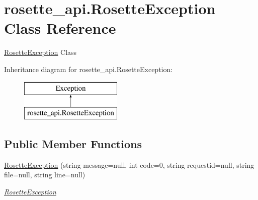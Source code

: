 \hypertarget{classrosette__api_1_1_rosette_exception}{}\section{rosette\+\_\+api.\+Rosette\+Exception Class Reference}
\label{classrosette__api_1_1_rosette_exception}


\hyperlink{classrosette__api_1_1_rosette_exception}{Rosette\+Exception} Class  


Inheritance diagram for rosette\+\_\+api.\+Rosette\+Exception\+:\begin{figure}[H]
\begin{center}
\leavevmode
\includegraphics[height=2.000000cm]{classrosette__api_1_1_rosette_exception}
\end{center}
\end{figure}
\subsection*{Public Member Functions}
\begin{DoxyCompactItemize}
\item 
\hyperlink{classrosette__api_1_1_rosette_exception_a065c5e007dad0541bdfa7cab0400b6b0}{Rosette\+Exception} (string message=null, int code=0, string requestid=null, string file=null, string line=null)
\begin{DoxyCompactList}\small\item\em \hyperlink{classrosette__api_1_1_rosette_exception}{Rosette\+Exception} \end{DoxyCompactList}\end{DoxyCompactItemize}
